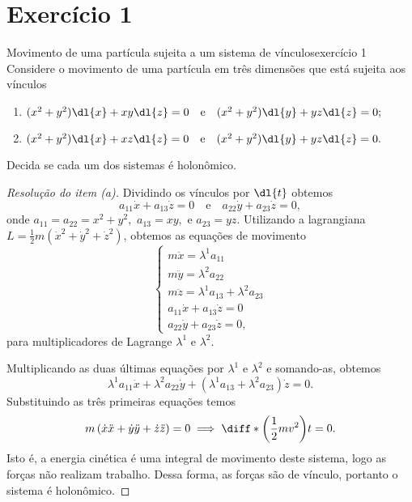 \section*{Exercício 1}
\begin{exercício}{Movimento de uma partícula sujeita a um sistema de vínculos}{exercício 1}
    Considere o movimento de uma partícula em três dimensões que está sujeita aos vínculos
    \begin{enumerate}[label=(\alph*)]
        \item \((x^2 + y^2)\dl{x} + xy\dl{z} = 0\quad\text{e}\quad(x^2+y^2)\dl{y} + yz\dl{z} = 0;\)
        \item \((x^2 + y^2)\dl{x} + xz\dl{z} = 0\quad\text{e}\quad(x^2+y^2)\dl{y} + yz\dl{z} = 0.\)
    \end{enumerate}
    Decida se cada um dos sistemas é holonômico.
\end{exercício}
\begin{proof}[Resolução do item (a)]
    Dividindo os vínculos por \(\dl{t}\) obtemos
    \begin{equation*}
        a_{11}\dot{x} + a_{13} \dot{z} = 0\quad\text{e}\quad a_{22}\dot{y} + a_{23}\dot{z} = 0,
    \end{equation*}
    onde \(a_{11} = a_{22} = x^2+y^2,\) \(a_{13} = xy,\) e \(a_{23} = yz\). Utilizando a lagrangiana \(L = \frac12 m \left(\dot{x}^2 + \dot{y}^2 + \dot{z}^2\right)\), obtemos as equações de movimento
    \begin{equation*}
        \begin{cases}
            m\ddot{x} = \lambda^1a_{11}\\
            m\ddot{y} = \lambda^2a_{22}\\
            m\ddot{z} = \lambda^1a_{13} + \lambda^2a_{23}\\
            a_{11}\dot{x} + a_{13} \dot{z} = 0\\
            a_{22}\dot{y} + a_{23}\dot{z} = 0,
        \end{cases}
    \end{equation*}
    para multiplicadores de Lagrange \(\lambda^1\) e \(\lambda^2\).

    Multiplicando as duas últimas equações por \(\lambda^1\) e \(\lambda^2\) e somando-as, obtemos
    \begin{equation*}
        \lambda^1 a_{11} \dot{x} + \lambda^2 a_{22} \dot{y} + \left(\lambda^1 a_{13} + \lambda^2 a_{23}\right)\dot{z} = 0.
    \end{equation*}
    Substituindo as três primeiras equações temos
    \begin{equation*}
        m\left(\dot{x}\ddot{x} + \dot{y}\ddot{y} + \dot{z}\ddot{z}\right) = 0 \implies \diff*{\left(\frac12mv^2\right)}{t} = 0.
    \end{equation*}
    Isto é, a energia cinética é uma integral de movimento deste sistema, logo as forças não realizam trabalho. Dessa forma, as forças são de vínculo, portanto o sistema é holonômico.
\end{proof}
